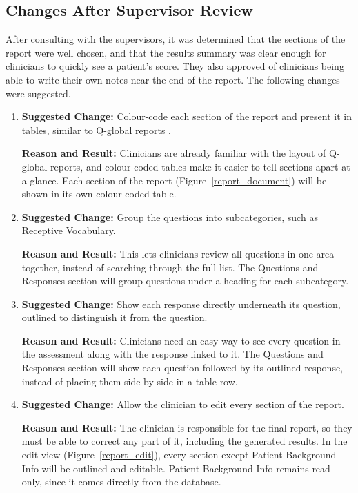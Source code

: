 \documentclass[12pt, titlepage]{article}
\begin{document}
\subsection{Changes After Supervisor Review}
\noindent After consulting with the supervisors, it was determined that the sections of the report were well chosen, and that the results summary was clear enough for clinicians to quickly see a patient's score. They also approved of clinicians being able to write their own notes near the end of the report. The following changes were suggested.
\begin{enumerate}
    \item \textbf{Suggested Change:} Colour-code each section of the report and present it in tables, similar to Q-global reports \citep{QGlobalCELF5Sample}.

    \textbf{Reason and Result:} Clinicians are already familiar with the layout of Q-global reports, and colour-coded tables make it easier to tell sections apart at a glance. Each section of the report (Figure~\ref{report_document}) will be shown in its own colour-coded table.

    \item \textbf{Suggested Change:} Group the questions into subcategories, such as Receptive Vocabulary.

    \textbf{Reason and Result:} This lets clinicians review all questions in one area together, instead of searching through the full list. The Questions and Responses section will group questions under a heading for each subcategory.

    \item \textbf{Suggested Change:} Show each response directly underneath its question, outlined to distinguish it from the question.

    \textbf{Reason and Result:} Clinicians need an easy way to see every question in the assessment along with the response linked to it. The Questions and Responses section will show each question followed by its outlined response, instead of placing them side by side in a table row.

    \item \textbf{Suggested Change:} Allow the clinician to edit every section of the report.

    \textbf{Reason and Result:} The clinician is responsible for the final report, so they must be able to correct any part of it, including the generated results. In the edit view (Figure~\ref{report_edit}), every section except Patient Background Info will be outlined and editable. Patient Background Info remains read-only, since it comes directly from the database.
\end{enumerate}
\end{document}
